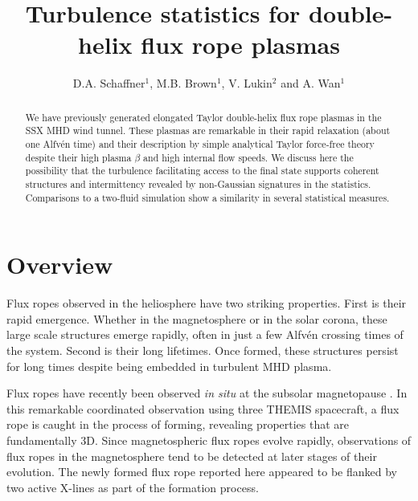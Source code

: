 \documentclass[12pt]{iopart}
\begin{document}
\title{Turbulence statistics for double-helix flux rope plasmas}

\author{D.A. Schaffner$^{1}$, M.B. Brown$^{1}$, V. Lukin$^{2}$ and A. Wan$^{1}$}

\address{$^{1}$ Swarthmore College, Swarthmore, PA, USA}
\address{$^{2}$ Naval Research Laboratory, Washington DC, USA}
\begin{abstract}
We have previously generated elongated Taylor double-helix flux rope plasmas in the SSX MHD wind tunnel.  These plasmas are remarkable in their rapid relaxation (about one Alfv\'en time) and their description by simple analytical Taylor force-free theory despite their high plasma $\beta$ and high internal flow speeds.  We discuss here the possibility that the turbulence facilitating access to the final state supports coherent structures and intermittency revealed by non-Gaussian signatures in the statistics.  Comparisons to a two-fluid simulation show a similarity in several statistical measures.
\end{abstract}

\submitto{\PPCF}
\maketitle

\section{Overview}
Flux ropes observed in the heliosphere have two striking properties.   First is their rapid emergence.  Whether in the magnetosphere or in the solar corona, these large scale structures emerge rapidly, often in just a few Alfv\'en crossing times of the system.  Second is their long lifetimes.  Once formed, these structures persist for long times despite being embedded in turbulent MHD plasma.  

Flux ropes have recently been observed {\it in situ} at the subsolar magnetopause \cite{Oieroset11}.  In this remarkable coordinated observation using three THEMIS spacecraft, a flux rope is caught in the process of forming, revealing properties that are fundamentally 3D. Since magnetospheric flux ropes evolve rapidly, observations of flux ropes in the magnetosphere tend to be detected at later stages of their evolution.  The newly formed flux rope reported here appeared to be flanked by two active X-lines as part of the formation process.
\end{document}
